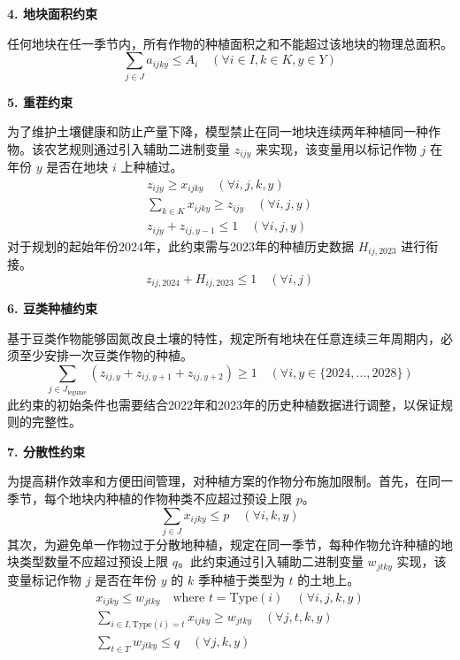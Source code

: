 \textbf{4. 地块面积约束}

任何地块在任一季节内，所有作物的种植面积之和不能超过该地块的物理总面积。
\begin{equation}
	\sum_{j \in J} a_{ijky} \le A_i \quad (\forall i \in I, k \in K, y \in Y) \label{eq:area_limit}
\end{equation}

\textbf{5. 重茬约束}

为了维护土壤健康和防止产量下降，模型禁止在同一地块连续两年种植同一种作物。该农艺规则通过引入辅助二进制变量 $z_{ijy}$ 来实现，该变量用以标记作物 $j$ 在年份 $y$ 是否在地块 $i$ 上种植过。
\begin{gather}
	z_{ijy} \ge x_{ijky} \quad (\forall i, j, k, y) \label{eq:z_def1} \\
	\sum_{k \in K} x_{ijky} \ge z_{ijy} \quad (\forall i, j, y) \label{eq:z_def2} \\
	z_{ijy} + z_{ij,y-1} \le 1 \quad (\forall i, j, y) \label{eq:rotation}
\end{gather}
对于规划的起始年份2024年，此约束需与2023年的种植历史数据 $H_{ij,2023}$ 进行衔接。
\begin{equation}
	z_{ij,2024} + H_{ij,2023} \le 1 \quad (\forall i, j) \label{eq:rotation_init}
\end{equation}

\textbf{6. 豆类种植约束}

基于豆类作物能够固氮改良土壤的特性，规定所有地块在任意连续三年周期内，必须至少安排一次豆类作物的种植。
\begin{equation}
	\sum_{j \in J_{\text{legume}}} (z_{ij,y} + z_{ij,y+1} + z_{ij,y+2}) \ge 1 \quad (\forall i, y \in \{2024, \dots, 2028\}) \label{eq:legume}
\end{equation}
此约束的初始条件也需要结合2022年和2023年的历史种植数据进行调整，以保证规则的完整性。

\textbf{7. 分散性约束}

为提高耕作效率和方便田间管理，对种植方案的作物分布施加限制。首先，在同一季节，每个地块内种植的作物种类不应超过预设上限 $p$。
\begin{equation}
	\sum_{j \in J} x_{ijky} \le p \quad (\forall i, k, y) \label{eq:p_limit}
\end{equation}
其次，为避免单一作物过于分散地种植，规定在同一季节，每种作物允许种植的地块类型数量不应超过预设上限 $q$。此约束通过引入辅助二进制变量 $w_{jtky}$ 实现，该变量标记作物 $j$ 是否在年份 $y$ 的 $k$ 季种植于类型为 $t$ 的土地上。
\begin{gather}
	x_{ijky} \le w_{jtky} \quad \text{where } t = \text{Type}(i) \quad (\forall i, j, k, y) \label{eq:w_def1} \\
	\sum_{i \in I, \text{Type}(i)=t} x_{ijky} \ge w_{jtky} \quad (\forall j, t, k, y) \label{eq:w_def2} \\
	\sum_{t \in T} w_{jtky} \le q \quad (\forall j, k, y) \label{eq:q_limit}
\end{gather}







